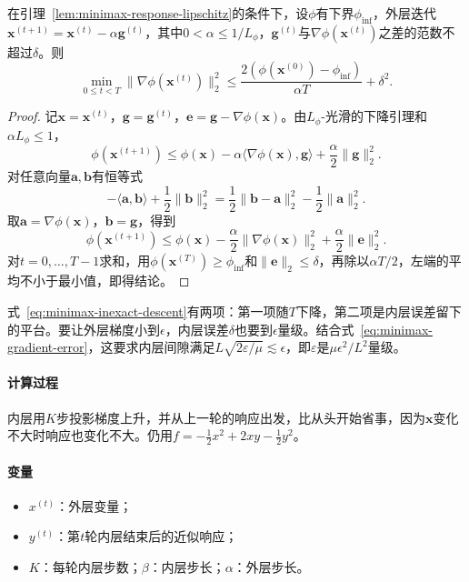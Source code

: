 \begin{theorem}[带内层误差的外层下降]
\label{thm:minimax-inexact-descent}
在引理~\ref{lem:minimax-response-lipschitz}的条件下，设$\phi$有下界$\phi_{\inf}$，外层迭代$\bm{x}^{(t+1)}=\bm{x}^{(t)}-\alpha\bm{g}^{(t)}$，其中$0<\alpha\leq1/L_\phi$，$\bm{g}^{(t)}$与$\nabla\phi(\bm{x}^{(t)})$之差的范数不超过$\delta$。则
\begin{equation}
 \min_{0\leq t<T}\lVert\nabla\phi(\bm{x}^{(t)})\rVert_2^2\leq\frac{2(\phi(\bm{x}^{(0)})-\phi_{\inf})}{\alpha T}+\delta^2.
 \label{eq:minimax-inexact-descent}
\end{equation}
\end{theorem}

\begin{proof}
记$\bm{x}=\bm{x}^{(t)}$，$\bm{g}=\bm{g}^{(t)}$，$\bm{e}=\bm{g}-\nabla\phi(\bm{x})$。由$L_\phi$-光滑的下降引理和$\alpha L_\phi\leq1$，
\[
 \phi(\bm{x}^{(t+1)})\leq\phi(\bm{x})-\alpha\langle\nabla\phi(\bm{x}),\bm{g}\rangle+\frac{\alpha}{2}\lVert\bm{g}\rVert_2^2.
\]
对任意向量$\bm{a},\bm{b}$有恒等式
\[
 -\langle\bm{a},\bm{b}\rangle+\frac12\lVert\bm{b}\rVert_2^2=\frac12\lVert\bm{b}-\bm{a}\rVert_2^2-\frac12\lVert\bm{a}\rVert_2^2.
\]
取$\bm{a}=\nabla\phi(\bm{x})$，$\bm{b}=\bm{g}$，得到
\[
 \phi(\bm{x}^{(t+1)})\leq\phi(\bm{x})-\frac{\alpha}{2}\lVert\nabla\phi(\bm{x})\rVert_2^2+\frac{\alpha}{2}\lVert\bm{e}\rVert_2^2.
\]
对$t=0,\ldots,T-1$求和，用$\phi(\bm{x}^{(T)})\geq\phi_{\inf}$和$\lVert\bm{e}\rVert_2\leq\delta$，再除以$\alpha T/2$，左端的平均不小于最小值，即得结论。
\end{proof}

式~\eqref{eq:minimax-inexact-descent}有两项：第一项随$T$下降，第二项是内层误差留下的平台。要让外层梯度小到$\epsilon$，内层误差$\delta$也要到$\epsilon$量级。结合式~\eqref{eq:minimax-gradient-error}，这要求内层间隙满足$L\sqrt{2\varepsilon/\mu}\lesssim\epsilon$，即$\varepsilon$是$\mu\epsilon^2/L^2$量级。

\paragraph{计算过程}
内层用$K$步投影梯度上升，并从上一轮的响应出发，比从头开始省事，因为$\bm{x}$变化不大时响应也变化不大。仍用$f=-\frac12x^2+2xy-\frac12y^2$。

\paragraph{变量}
\begin{itemize}
 \item $x^{(t)}$：外层变量；
 \item $y^{(t)}$：第$t$轮内层结束后的近似响应；
 \item $K$：每轮内层步数；$\beta$：内层步长；$\alpha$：外层步长。
\end{itemize}

